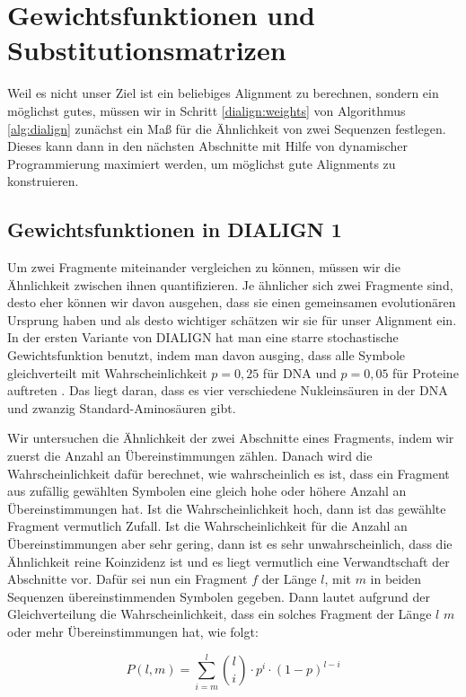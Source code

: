 \section{Gewichtsfunktionen und Substitutionsmatrizen}

Weil es nicht unser Ziel ist ein beliebiges Alignment zu berechnen, sondern ein möglichst gutes, müssen wir in Schritt \ref{dialign:weights} von Algorithmus \ref{alg:dialign} zunächst ein Maß für die Ähnlichkeit von zwei Sequenzen festlegen. Dieses kann dann in den nächsten Abschnitte mit Hilfe von dynamischer Programmierung maximiert werden, um möglichst gute Alignments zu konstruieren.

\subsection{Gewichtsfunktionen in DIALIGN 1}

Um zwei Fragmente miteinander vergleichen zu können, müssen wir die Ähnlichkeit zwischen ihnen quantifizieren. Je ähnlicher sich zwei Fragmente sind, desto eher können wir davon ausgehen, dass sie einen gemeinsamen evolutionären Ursprung haben und als desto wichtiger schätzen wir sie für unser Alignment ein. In der ersten Variante von DIALIGN hat man eine starre stochastische Gewichtsfunktion benutzt, indem man davon ausging, dass alle Symbole gleichverteilt mit Wahrscheinlichkeit $p = 0{,}25$ für DNA und $p = 0{,}05$ für Proteine auftreten \cite{mdw96}. Das liegt daran, dass es vier verschiedene Nukleinsäuren in der DNA und zwanzig Standard-Aminosäuren gibt. 

Wir untersuchen die Ähnlichkeit der zwei Abschnitte eines Fragments, indem wir zuerst die Anzahl an Übereinstimmungen zählen. Danach wird die Wahrscheinlichkeit dafür berechnet, wie wahrscheinlich es ist, dass ein Fragment aus zufällig gewählten Symbolen eine gleich hohe oder höhere Anzahl an Übereinstimmungen hat. Ist die Wahrscheinlichkeit hoch, dann ist das gewählte Fragment vermutlich Zufall. Ist die Wahrscheinlichkeit für die Anzahl an Übereinstimmungen aber sehr gering, dann ist es sehr unwahrscheinlich, dass die Ähnlichkeit reine Koinzidenz ist und es liegt vermutlich eine Verwandtschaft der Abschnitte vor\cite{mdw96}. Dafür sei nun ein Fragment $f$ der Länge $l$, mit $m$ in beiden Sequenzen übereinstimmenden Symbolen gegeben. Dann lautet aufgrund der Gleichverteilung die Wahrscheinlichkeit, dass ein solches Fragment der Länge $l$ $m$ oder mehr Übereinstimmungen hat, wie folgt:

\begin{equation}\label{eq:prob_old}
	P(l,m) = \sum_{i=m}^{l} {l \choose i} \cdot p^i \cdot (1-p)^{l-i}
\end{equation}

